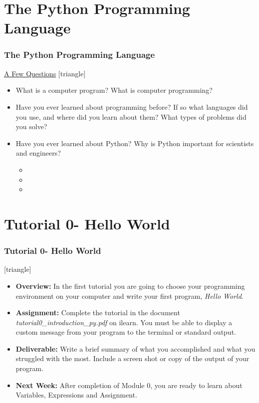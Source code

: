 \documentclass[fleqn]{beamer} %
\newcommand{\MNUM}{0\hspace{2mm}} %
\newcommand{\sectiontitleIV}{The Python Programming Language}
\newcommand{\sectiontitleV}{Tutorial \MNUM - Hello World}
\begin{document}
\section{\sectiontitleIV}	
	\begin{frame}[label=sectionIV] \small
		\frametitle{\sectiontitleIV}    
		
		\underline{A Few Questions}
		[triangle]
		\begin{itemize}
			
			\item What is a computer program? What is computer programming?
			
			\item Have you ever learned about programming before? If so what languages did you use, and where did you learn about them? What types of problems did you solve?
			
			\item Have you ever learned about Python? Why is Python important for scientists and engineers? 
				\begin{itemize}
					\item 
					\item
					\item
				\end{itemize}			
			
		\end{itemize}
	\end{frame}

\section{\sectiontitleV}	
	            \begin{frame}[label=sectionV] \small
		\frametitle{\sectiontitleV}    
	
 [triangle]
                \begin{itemize}

					\item {\bf Overview:} In the first tutorial you are going to choose your programming environment on your computer and write your first program, {\it Hello World}.  		

					\item {\bf Assignment:} Complete the tutorial in the document {\it tutorial\MNUM\_introduction\_py.pdf } on ilearn. You must be able to display a custom message from your program to the terminal or standard output.
                    
                    \item {\bf Deliverable:} Write a brief summary of what you accomplished and what you struggled with the most. Include a screen shot or copy of the output of your program.   
    
                    \item {\bf Next Week:} After completion of Module \MNUM, you are ready to learn about Variables, Expressions and Assignment. \vspc
                    
       
                \end{itemize}
		\end{frame}
\end{document}
